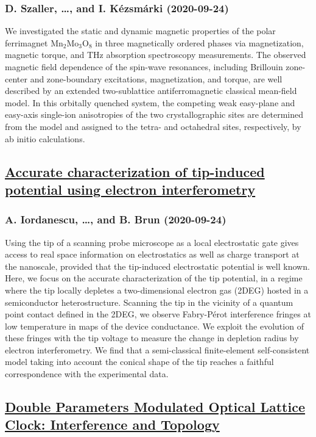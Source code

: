 \subsubsection*{D. Szaller, \dots, and I. Kézsmárki (2020-09-24)}
We investigated the static and dynamic magnetic properties of the polar
ferrimagnet Mn$_2$Mo$_3$O$_8$ in three magnetically ordered phases via
magnetization, magnetic torque, and THz absorption spectroscopy measurements.
The observed magnetic field dependence of the spin-wave resonances, including
Brillouin zone-center and zone-boundary excitations, magnetization, and torque,
are well described by an extended two-sublattice antiferromagnetic classical
mean-field model. In this orbitally quenched system, the competing weak
easy-plane and easy-axis single-ion anisotropies of the two crystallographic
sites are determined from the model and assigned to the tetra- and octahedral
sites, respectively, by ab initio calculations.

\subsection*{\href{http://arxiv.org/abs/2009.11672v1}{Accurate characterization of tip-induced potential using electron  interferometry}}
\subsubsection*{A. Iordanescu, \dots, and B. Brun (2020-09-24)}
Using the tip of a scanning probe microscope as a local electrostatic gate
gives access to real space information on electrostatics as well as charge
transport at the nanoscale, provided that the tip-induced electrostatic
potential is well known. Here, we focus on the accurate characterization of the
tip potential, in a regime where the tip locally depletes a two-dimensional
electron gas (2DEG) hosted in a semiconductor heterostructure. Scanning the tip
in the vicinity of a quantum point contact defined in the 2DEG, we observe
Fabry-P\'erot interference fringes at low temperature in maps of the device
conductance. We exploit the evolution of these fringes with the tip voltage to
measure the change in depletion radius by electron interferometry. We find that
a semi-classical finite-element self-consistent model taking into account the
conical shape of the tip reaches a faithful correspondence with the
experimental data.

\subsection*{\href{http://arxiv.org/abs/2009.11671v1}{Double Parameters Modulated Optical Lattice Clock: Interference and  Topology}}
